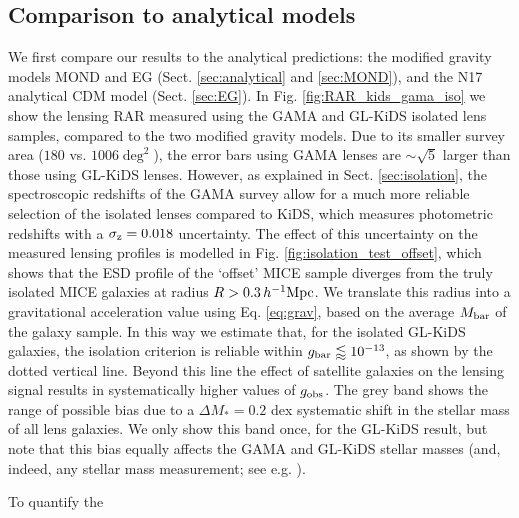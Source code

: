 \documentclass[usenatbib]{mnras}
\newcommand{\hMpc}{\, h^{-1}{\rm{Mpc}} }
\newcommand{\un}[1]{_{\rm #1}}
\begin{document}
\subsection{Comparison to analytical models}

We first compare our results to the analytical predictions: the modified gravity models MOND and EG (Sect. \ref{sec:analytical} and \ref{sec:MOND}), and the N17 analytical CDM model (Sect. \ref{sec:EG}). In Fig. \ref{fig:RAR_kids_gama_iso} we show the lensing RAR measured using the GAMA and GL-KiDS isolated lens samples, compared to the two modified gravity models. Due to its smaller survey area ($180$ vs. $1006 \deg^2$), the error bars using GAMA lenses are $\sim\sqrt{5}$ larger than those using GL-KiDS lenses. However, as explained in Sect. \ref{sec:isolation}, the spectroscopic redshifts of the GAMA survey allow for a much more reliable selection of the isolated lenses compared to KiDS, which measures photometric redshifts with a $\sigma\un{z}=0.018$ uncertainty. The effect of this uncertainty on the measured lensing profiles is modelled in Fig. \ref{fig:isolation_test_offset}, which shows that the ESD profile of the `offset' MICE sample diverges from the truly isolated MICE galaxies at radius $R > 0.3 \hMpc$. We translate this radius into a gravitational acceleration value using Eq. \ref{eq:grav}, based on the average $M\un{bar}$ of the galaxy sample. In this way we estimate that, for the isolated GL-KiDS galaxies, the isolation criterion is reliable within $g\un{bar} \lessapprox 10^{-13}$, as shown by the dotted vertical line. Beyond this line the effect of satellite galaxies on the lensing signal results in systematically higher values of $g\un{obs}$. The grey band shows the range of possible bias due to a $\Delta M_*=0.2$ dex systematic shift in the stellar mass of all lens galaxies. We only show this band once, for the GL-KiDS result, but note that this bias equally affects the GAMA and GL-KiDS stellar masses (and, indeed, any stellar mass measurement; see e.g. \citealt{wright2017}).

To quantify the 

\end{document}
